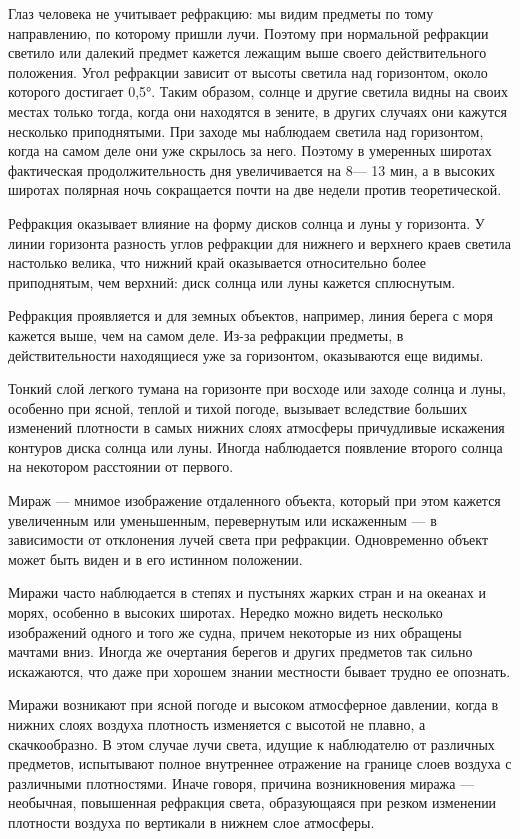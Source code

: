 Глаз человека не учитывает рефракцию: мы видим предметы по тому направлению, по которому пришли лучи. Поэтому при нормальной рефракции светило или далекий предмет кажется лежащим выше своего действительного положения. Угол рефракции зависит от высоты светила над горизонтом, около которого достигает 0,5°. Таким образом, солнце и другие светила видны на своих местах только тогда, когда они находятся в зените, в других случаях они кажутся несколько приподнятыми. При заходе мы наблюдаем светила над горизонтом, когда на самом деле они уже скрылось за него. Поэтому в умеренных широтах фактическая продолжительность дня увеличивается на 8— 13 мин, а в высоких широтах полярная ночь сокращается почти на две недели против теоретической.

Рефракция оказывает влияние на форму дисков солнца и луны у горизонта. У линии горизонта разность углов рефракции для нижнего и верхнего краев светила настолько велика, что нижний край оказывается относительно более приподнятым, чем верхний: диск солнца или луны кажется сплюснутым.

Рефракция проявляется и для земных объектов, например, линия берега с моря кажется выше, чем на самом деле. Из-за рефракции предметы, в действительности находящиеся уже за горизонтом, оказываются еще видимы.

Тонкий слой легкого тумана на горизонте при восходе или заходе солнца и луны, особенно при ясной, теплой и тихой погоде, вызывает вследствие больших изменений плотности в самых нижних слоях атмосферы причудливые искажения контуров диска солнца или луны. Иногда наблюдается появление второго солнца на некотором расстоянии от первого.

Мираж — мнимое изображение отдаленного объекта, который при этом кажется увеличенным или уменьшенным, перевернутым или искаженным — в зависимости от отклонения лучей света при рефракции. Одновременно объект может быть виден и в его истинном положении.

Миражи часто наблюдается в степях и пустынях жарких стран и на океанах и морях, особенно в высоких широтах. Нередко можно видеть несколько изображений одного и того же судна, причем некоторые из них обращены мачтами вниз. Иногда же очертания берегов и других предметов так сильно искажаются, что даже при хорошем знании местности бывает трудно ее опознать.

Миражи возникают при ясной погоде и высоком атмосферное давлении, когда в нижних слоях воздуха плотность изменяется с высотой не плавно, а скачкообразно. В этом случае лучи света, идущие к наблюдателю от различных предметов, испытывают полное внутреннее отражение на границе слоев воздуха с различными плотностями. Иначе говоря, причина возникновения миража — необычная, повышенная рефракция света, образующаяся при резком изменении плотности воздуха по вертикали в нижнем слое атмосферы.

